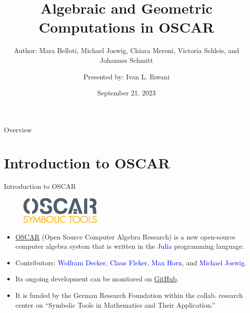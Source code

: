 \documentclass[aspectratio=169,xcolor=dvipsnames]{beamer}
\title[Algebraic \& Geo. Comp. in OSCAR]{Algebraic and Geometric Computations in OSCAR} %
\subtitle{Author: Mara Belloti, Michael Joswig, Chiara Meroni, Victoria Schleis, and Johannes Schmitt}
\author[Ivan L. Ihwani]{Presented by: Ivan L. Ihwani}
\institute[SIAM NEWS SEPTEMBER 2023]{Department of Mathematics \newline National Central University}
\date{September 21, 2023} %
\begin{document}
\begin{frame}[plain]
    \titlepage
\end{frame}

\begin{frame}{Overview}
    \tableofcontents
\end{frame}

\section{Introduction to OSCAR}
\begin{frame}{Introduction to OSCAR}
\begin{figure}[h]
\includegraphics[width=4cm]{logos/OSCAR_logo.png}
\end{figure}
    \begin{itemize}
        \item \textcolor{blue}{\href{https://www.oscar-system.org/}{OSCAR}} (Open Source Computer Algebra Research) is a new open-source computer algebra system that is written in the \textcolor{blue}{Julia} programming language.
        \item Contributors: \textcolor{blue}{Wolfram Decker}, \textcolor{blue}{Claus Fleker}, \textcolor{blue}{Max Horn}, and \textcolor{blue}{Michael Joswig}. 
        \item Its ongoing development can be monitored on \href{https://github.com/oscar-system}{GitHub}.
        \item It is funded by the German Research Foundation within the collab. research center on \enquote{Symbolic Tools in Mathematics and Their Application.}
    \end{itemize}
\end{frame}
\end{document}
